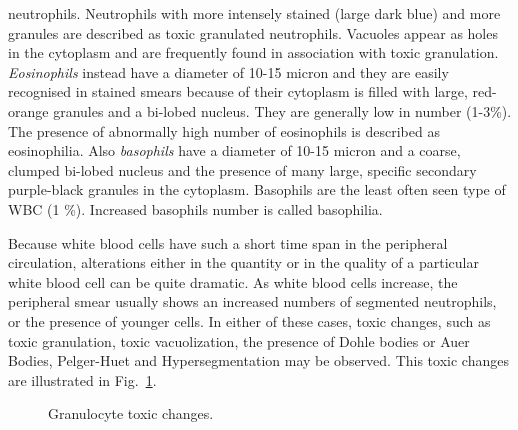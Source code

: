 \documentclass[final,a4paper,12pt,english]{UnicaPhdThesis3}
\begin{document}
neutrophils. Neutrophils with more intensely stained (large dark blue) and more granules are described as toxic granulated neutrophils. Vacuoles appear as holes in the cytoplasm and are frequently found in association with toxic granulation. \textit{Eosinophils} instead have a diameter of 10-15 micron and they are easily recognised in stained smears because of their cytoplasm is filled with large, red-orange granules and a bi-lobed nucleus. They are generally low in number (1-3\%). The presence of abnormally high number of eosinophils is described as eosinophilia. Also \textit{basophils} have a diameter of 10-15 micron and a coarse, clumped bi-lobed nucleus and the presence of many large, specific secondary purple-black granules in the cytoplasm. Basophils are the least often seen type of WBC (1	\%). Increased basophils number is called basophilia.
	
	Because white blood cells have such a short time span in the peripheral circulation, alterations either in the quantity or in the quality of a particular white blood cell can be quite dramatic. As white blood cells increase, the peripheral smear usually shows an increased numbers of segmented neutrophils, or the presence of younger cells. In either of these cases, toxic changes, such as toxic granulation, toxic vacuolization, the presence of Dohle bodies or Auer Bodies, Pelger-Huet and Hypersegmentation may be observed. This toxic changes are illustrated in Fig.~\ref{fig:Changes}.
	
	
	\begin{figure}[!htbp]
		\centering
		\caption{\label{fig:Changes} Granulocyte toxic changes.}
	\end{figure}
	
\end{document}
